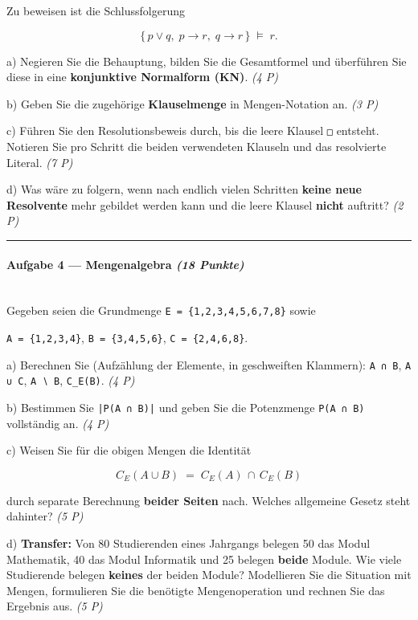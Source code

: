 \documentclass[11pt, a4paper]{article}
\begin{document}
Zu beweisen ist die Schlussfolgerung

\[
\{\,p \lor q,\; p \to r,\; q \to r\,\} \;\models\; r.
\]


a) Negieren Sie die Behauptung, bilden Sie die Gesamtformel und überführen Sie diese in eine \textbf{konjunktive Normalform (KN)}. \textit{(4 P)}


b) Geben Sie die zugehörige \textbf{Klauselmenge} in Mengen-Notation an. \textit{(3 P)}


c) Führen Sie den Resolutionsbeweis durch, bis die leere Klausel \texttt{□} entsteht. Notieren Sie pro Schritt die beiden verwendeten Klauseln und das resolvierte Literal. \textit{(7 P)}


d) Was wäre zu folgern, wenn nach endlich vielen Schritten \textbf{keine neue Resolvente} mehr gebildet werden kann und die leere Klausel \textbf{nicht} auftritt? \textit{(2 P)}



\noindent\textcolor{rulegray}{\rule{\linewidth}{0.4pt}}


\paragraph{Aufgabe 4 — Mengenalgebra \textit{(18 Punkte)}}\mbox{}\\[2pt]

Gegeben seien die Grundmenge \texttt{E = \{1,2,3,4,5,6,7,8\}} sowie

\texttt{A = \{1,2,3,4\}},  \texttt{B = \{3,4,5,6\}},  \texttt{C = \{2,4,6,8\}}.


a) Berechnen Sie (Aufzählung der Elemente, in geschweiften Klammern): \texttt{A ∩ B}, \texttt{A ∪ C}, \texttt{A ∖ B}, \texttt{C\_E(B)}. \textit{(4 P)}


b) Bestimmen Sie \texttt{|P(A ∩ B)|} und geben Sie die Potenzmenge \texttt{P(A ∩ B)} vollständig an. \textit{(4 P)}


c) Weisen Sie für die obigen Mengen die Identität

\[
C_E(A \cup B) \;=\; C_E(A) \,\cap\, C_E(B)
\]

durch separate Berechnung \textbf{beider Seiten} nach. Welches allgemeine Gesetz steht dahinter? \textit{(5 P)}


d) \textbf{Transfer:} Von 80 Studierenden eines Jahrgangs belegen 50 das Modul Mathematik, 40 das Modul Informatik und 25 belegen \textbf{beide} Module. Wie viele Studierende belegen \textbf{keines} der beiden Module? Modellieren Sie die Situation mit Mengen, formulieren Sie die benötigte Mengenoperation und rechnen Sie das Ergebnis aus. \textit{(5 P)}
\end{document}

